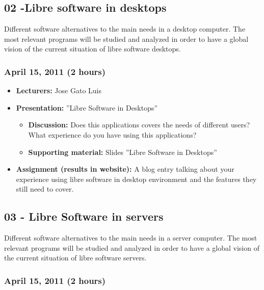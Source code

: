 \documentclass[a4paper]{article}
\begin{document}
\subsection{02 -Libre software in desktops}

Different software alternatives to the main needs in a desktop computer. The most relevant programs will be studied and analyzed in order to have a global vision of the current situation of libre software desktops. 

\subsubsection{April 15, 2011 (2 hours)}

\begin{itemize}
\item \textbf{Lecturers:} Jose Gato Luis
\item \textbf{Presentation:} ''Libre Software in Desktops''
  \begin{itemize}
  \item \textbf{Discussion:} Does this applications covers the needs of different users? What experience do you have using this applications?
  \item \textbf{Supporting material:} Slides ''Libre Software in Desktops''
  \end{itemize}
\item \textbf{Assignment (results in website):} A blog entry talking about your experience using libre software in desktop environment and the features they still need to cover. 
\end{itemize}

\subsection{03 - Libre Software in servers}

Different software alternatives to the main needs in a server computer. The most relevant programs will be studied and analyzed in order to have a global vision of the current situation of libre software servers. 

\subsubsection{April 15, 2011 (2 hours)}
\end{document}
